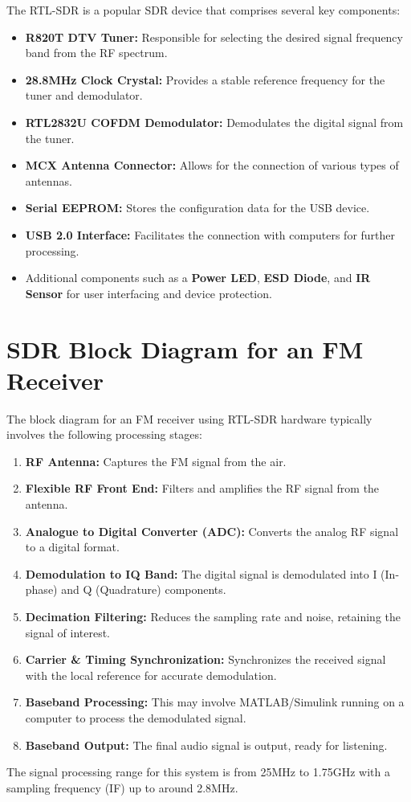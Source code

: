 The RTL-SDR is a popular SDR device that comprises several key components:
\begin{itemize}
    \item \textbf{R820T DTV Tuner:} Responsible for selecting the desired signal frequency band from the RF spectrum.
    \item \textbf{28.8MHz Clock Crystal:} Provides a stable reference frequency for the tuner and demodulator.
    \item \textbf{RTL2832U COFDM Demodulator:} Demodulates the digital signal from the tuner.
    \item \textbf{MCX Antenna Connector:} Allows for the connection of various types of antennas.
    \item \textbf{Serial EEPROM:} Stores the configuration data for the USB device.
    \item \textbf{USB 2.0 Interface:} Facilitates the connection with computers for further processing.
    \item Additional components such as a \textbf{Power LED}, \textbf{ESD Diode}, and \textbf{IR Sensor} for user interfacing and device protection.
\end{itemize}

\section*{SDR Block Diagram for an FM Receiver}

The block diagram for an FM receiver using RTL-SDR hardware typically involves the following processing stages:
\begin{enumerate}
    \item \textbf{RF Antenna:} Captures the FM signal from the air.
    \item \textbf{Flexible RF Front End:} Filters and amplifies the RF signal from the antenna.
    \item \textbf{Analogue to Digital Converter (ADC):} Converts the analog RF signal to a digital format.
    \item \textbf{Demodulation to IQ Band:} The digital signal is demodulated into I (In-phase) and Q (Quadrature) components.
    \item \textbf{Decimation Filtering:} Reduces the sampling rate and noise, retaining the signal of interest.
    \item \textbf{Carrier \& Timing Synchronization:} Synchronizes the received signal with the local reference for accurate demodulation.
    \item \textbf{Baseband Processing:} This may involve MATLAB/Simulink running on a computer to process the demodulated signal.
    \item \textbf{Baseband Output:} The final audio signal is output, ready for listening.
\end{enumerate}
The signal processing range for this system is from 25MHz to 1.75GHz with a sampling frequency (IF) up to around 2.8MHz.



